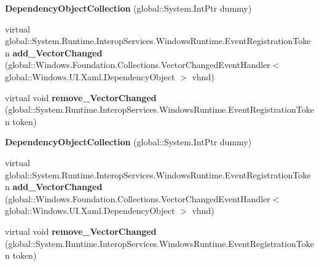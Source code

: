 \begin{DoxyCompactItemize}
\item 
\mbox{\label{class_windows_1_1_u_i_1_1_xaml_1_1_dependency_object_collection_aae876d96e705148d2425bda950792fb8}} 
{\bfseries Dependency\+Object\+Collection} (global\+::\+System.\+Int\+Ptr dummy)
\item 
\mbox{\label{class_windows_1_1_u_i_1_1_xaml_1_1_dependency_object_collection_a4891caca0ff7188ffc71a5e248053e6d}} 
virtual global\+::\+System.\+Runtime.\+Interop\+Services.\+Windows\+Runtime.\+Event\+Registration\+Token {\bfseries add\+\_\+\+Vector\+Changed} (global\+::\+Windows.\+Foundation.\+Collections.\+Vector\+Changed\+Event\+Handler$<$ global\+::\+Windows.\+U\+I.\+Xaml.\+Dependency\+Object $>$ vhnd)
\item 
\mbox{\label{class_windows_1_1_u_i_1_1_xaml_1_1_dependency_object_collection_a940ed4f33f8d86b62b76cddcdf7bdc55}} 
virtual void {\bfseries remove\+\_\+\+Vector\+Changed} (global\+::\+System.\+Runtime.\+Interop\+Services.\+Windows\+Runtime.\+Event\+Registration\+Token token)
\item 
\mbox{\label{class_windows_1_1_u_i_1_1_xaml_1_1_dependency_object_collection_aae876d96e705148d2425bda950792fb8}} 
{\bfseries Dependency\+Object\+Collection} (global\+::\+System.\+Int\+Ptr dummy)
\item 
\mbox{\label{class_windows_1_1_u_i_1_1_xaml_1_1_dependency_object_collection_a4891caca0ff7188ffc71a5e248053e6d}} 
virtual global\+::\+System.\+Runtime.\+Interop\+Services.\+Windows\+Runtime.\+Event\+Registration\+Token {\bfseries add\+\_\+\+Vector\+Changed} (global\+::\+Windows.\+Foundation.\+Collections.\+Vector\+Changed\+Event\+Handler$<$ global\+::\+Windows.\+U\+I.\+Xaml.\+Dependency\+Object $>$ vhnd)
\item 
\mbox{\label{class_windows_1_1_u_i_1_1_xaml_1_1_dependency_object_collection_a940ed4f33f8d86b62b76cddcdf7bdc55}} 
virtual void {\bfseries remove\+\_\+\+Vector\+Changed} (global\+::\+System.\+Runtime.\+Interop\+Services.\+Windows\+Runtime.\+Event\+Registration\+Token token)

\end{DoxyCompactItemize}
